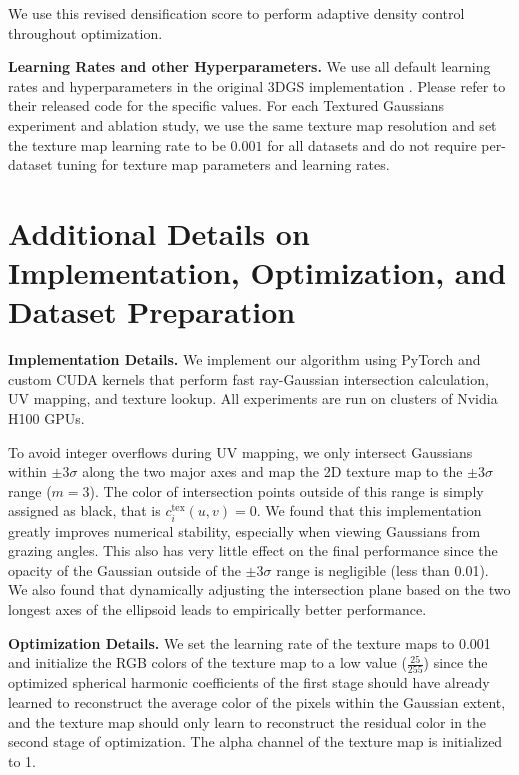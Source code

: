 We use this revised densification score to perform adaptive density control throughout optimization. 

\noindent \textbf{Learning Rates and other Hyperparameters. } We use all default learning rates and hyperparameters in the original 3DGS implementation \cite{kerbl3Dgaussians}. Please refer to their released code for the specific values. For each Textured Gaussians experiment and ablation study, we use the same texture map resolution and set the texture map learning rate to be $0.001$ for all datasets and do not require per-dataset tuning for texture map parameters and learning rates.

\section{Additional Details on Implementation, Optimization, and Dataset Preparation} 

\noindent \textbf{Implementation Details.} We implement our algorithm using PyTorch and custom CUDA kernels that perform fast ray-Gaussian intersection calculation, UV mapping, and texture lookup. All experiments are run on clusters of Nvidia H100 GPUs. 

To avoid integer overflows during UV mapping, we only intersect Gaussians within $\pm 3\sigma$ along the two major axes and map the 2D texture map to the $\pm 3\sigma$ range ($m = 3$). The color of intersection points outside of this range is simply assigned as black, that is $c_i^\text{tex}(u, v) = 0$. We found that this implementation greatly improves numerical stability, especially when viewing Gaussians from grazing angles. This also has very little effect on the final performance since the opacity of the Gaussian outside of the $\pm 3\sigma$ range is negligible (less than 0.01). We also found that dynamically adjusting the intersection plane based on the two longest axes of the ellipsoid leads to empirically better performance.

\noindent \textbf{Optimization Details. } We set the learning rate of the texture maps to 0.001 and initialize the RGB colors of the texture map to a low value ($\frac{25}{255}$) since the optimized spherical harmonic coefficients of the first stage should have already learned to reconstruct the average color of the pixels within the Gaussian extent, and the texture map should only learn to reconstruct the residual color in the second stage of optimization. The alpha channel of the texture map is initialized to 1. 

